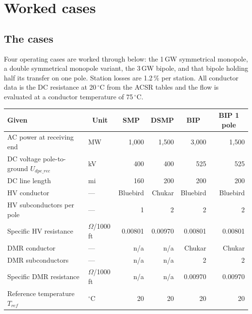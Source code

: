 \section{Worked cases}
\label{sec:reference}

\subsection{The cases}
Four operating cases are worked through below: the 1\,GW symmetrical monopole,
a double symmetrical monopole variant, the 3\,GW bipole, and that bipole
holding half its transfer on one pole. Station losses are 1.2\,\% per station.
All conductor data is the DC resistance at
20\,$^{\circ}$C from the ACSR tables and the flow is evaluated at a conductor
temperature of 75\,$^{\circ}$C.

\begin{table}[!ht]
  \centering
  \small
  \renewcommand{\arraystretch}{1.25}
  \begin{tabularx}{\linewidth}{@{}X l r r r r@{}}
    \toprule
    \textbf{Given} & \multicolumn{1}{c}{\textbf{Unit}} &
    \multicolumn{1}{c}{\textbf{SMP}} & \multicolumn{1}{c}{\textbf{DSMP}} & \multicolumn{1}{c}{\textbf{BIP}} &
    \multicolumn{1}{c}{\textbf{BIP 1 pole}} \\
    \midrule
    AC power at receiving end     & MW                & 1{,}000 & 1{,}500 & 3{,}000 & 1{,}500 \\
    DC voltage pole-to-ground $U_{dpe\_rec}$ & kV                & 400     & 400     & 525     & 525     \\
    DC line length                & mi                & 160     & 200     & 200     & 200     \\
    HV conductor                  & ---               & Bluebird & Chukar & Bluebird & Bluebird \\
    HV subconductors per pole     & ---               & 1       & 2       & 2       & 2       \\
    Specific HV resistance        & $\Omega$/1000\,ft & 0.00801 & 0.00970 & 0.00801 & 0.00801 \\
    DMR conductor                 & ---               & n/a     & n/a     & Chukar  & Chukar  \\
    DMR subconductors             & ---               & n/a     & n/a     & 2       & 2       \\
    Specific DMR resistance       & $\Omega$/1000\,ft & n/a     & n/a     & 0.00970 & 0.00970 \\
    Reference temperature $T_{ref}$ & $^{\circ}$C     & 20      & 20      & 20      & 20      \\

\end{tabularx}
\end{table}
